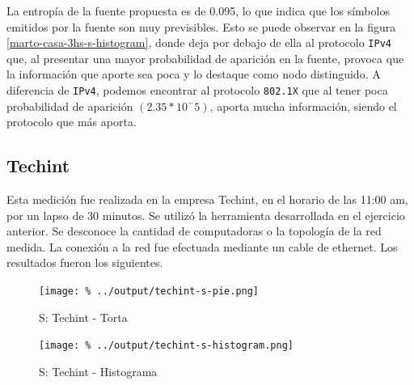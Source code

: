\documentclass[final,inline,a4paper,narroweqnarray]{ieee}
\begin{document}
    La entropía de la fuente propuesta es de 0.095, lo que indica que
    los símbolos emitidos por la fuente son muy previsibles. Esto se
    puede observar en la figura \ref{marto-casa-3hs-s-histogram},
    donde deja por debajo de ella al protocolo \texttt{IPv4} que, al
    presentar una mayor probabilidad de aparición en la fuente,
    provoca que la información que aporte sea poca y lo destaque como
    nodo distinguido. A diferencia de
    \texttt{IPv4}, podemos encontrar al protocolo \texttt{802.1X} que al
    tener poca probabilidad de aparición $(2.35 * 10^-5)$, aporta mucha
    información, siendo el protocolo que más aporta.
      
    
    \subsection{Techint}

    Esta medición fue realizada en la empresa Techint, en el horario
    de las 11:00 am, por un lapso de 30 minutos. Se utilizó la
    herramienta desarrollada en el ejercicio anterior. Se desconoce la
    cantidad de computadoras o la topología de la red medida. La
    conexión a la red fue efectuada mediante un cable de ethernet. Los
    resultados fueron los siguientes.
    
    
    \begin{figure}[ht]\begin{center}
      \texttt{[image: \%
      ../output/techint-s-pie.png]}
      \vspace{-3em}
      \caption{S: Techint - Torta}
      \label{techint-s-pie}
    \end{center}\end{figure}
 
     
    \begin{figure}[ht]\begin{center}
      \texttt{[image: \%
      ../output/techint-s-histogram.png]}
      \caption{S: Techint - Histograma}
      \label{techint-s-histogram}
    \end{center}\end{figure}
\end{document}
